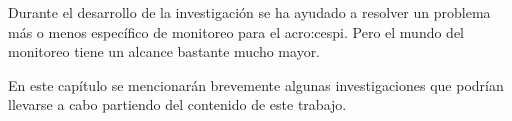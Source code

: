 Durante el desarrollo de la investigación se ha ayudado a resolver un
problema más o menos específico de monitoreo para el \gls{acro:cespi}.
Pero el mundo del monitoreo tiene un alcance bastante mucho mayor.

En este capítulo se mencionarán brevemente algunas investigaciones que
podrían llevarse a cabo partiendo del contenido de este trabajo.
